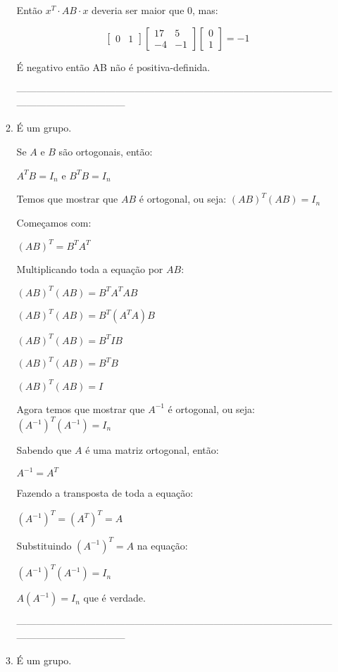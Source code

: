\documentclass[leqno]{article}
\numberwithin{equation}{section}
\begin{document}
\begin{enumerate}
\begin{sol}
\begin{enumerate}
				Então $x^T \cdot AB \cdot x$ deveria ser maior que 0, mas:
				
				$$\begin{bmatrix}
					0 & 1
				\end{bmatrix}\begin{bmatrix}
					17 & 5 \\
					-4 & -1
				\end{bmatrix}\begin{bmatrix}
					0 \\
					1
				\end{bmatrix} = -1$$
			
				É negativo então AB não é positiva-definida.
				
				---------------------------------------------------------------------------------------------------------------------------------
				
				\item É um grupo.
				
				Se $A$ e $B$ são ortogonais, então:
				
				$A^TB = I_n$ e $B^TB = I_n$
				
				Temos que mostrar que $AB$ é ortogonal, ou seja: $(AB)^T(AB) = I_n$
				
				Começamos com:
				
				$(AB)^T = B^T A^T$
				
				Multiplicando toda a equação por $AB$:
				
				$(AB)^T(AB) = B^T A^T AB$
				
				$(AB)^T(AB) = B^T (A^T A)B$
				
				$(AB)^T(AB) = B^T I B$
				
				$(AB)^T(AB) = B^T B$
				
				$(AB)^T(AB) = I$
				
				Agora temos que mostrar que $A^{-1}$ é ortogonal, ou seja: $(A^{-1})^T(A^{-1}) = I_n$
				
				Sabendo que $A$ é uma matriz ortogonal, então:
				
				$A^{-1} = A^T$
				
				Fazendo a transposta de toda a equação:
				
				$(A^{-1})^T = (A^T)^T = A$
				
				Substituindo $(A^{-1})^T = A$ na equação:
				
				$(A^{-1})^T(A^{-1}) = I_n$
				
				$A (A^{-1}) = I_n$ que é verdade.
				
				---------------------------------------------------------------------------------------------------------------------------------
				\item É um grupo.
				

\end{enumerate}
\end{sol}
\end{enumerate}
\end{document}
